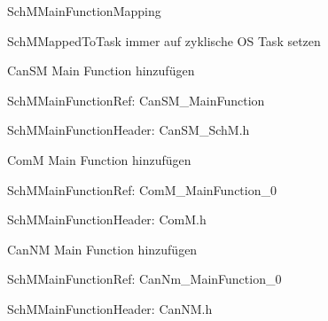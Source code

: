 \begin{compactitem}
    \item SchMMainFunctionMapping
    \begin{compactitem}
        \item SchMMappedToTask immer auf zyklische OS Task setzen
        \item CanSM Main Function hinzufügen
        \begin{compactitem}
            \item SchMMainFunctionRef: CanSM\_MainFunction
            \item SchMMainFunctionHeader: CanSM\_SchM.h
        \end{compactitem}
        \item ComM Main Function hinzufügen
        \begin{compactitem}
            \item SchMMainFunctionRef: ComM\_MainFunction\_0
            \item SchMMainFunctionHeader: ComM.h
        \end{compactitem}
        \item CanNM Main Function hinzufügen
        \begin{compactitem}
            \item SchMMainFunctionRef: CanNm\_MainFunction\_0
            \item SchMMainFunctionHeader: CanNM.h
        \end{compactitem}
    \end{compactitem}


\end{compactitem}
